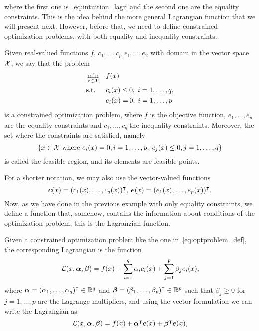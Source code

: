 where the first one is~\eqref{eq:intuition_lagr} and the second one are the equality constraints.
This is the idea behind the more general Lagrangian function that we will present next. 
However, before that, we need to define constrained optimization problems, with both equality and inequality constraints.
\begin{definition}
    Given real-valued functions $f$, $c_1, \ldots, c_p$ $e_1, \ldots, e_2$ with domain in the vector space $\mathcal{X}$,
    we say that the problem
    \begin{equation}\label{eq:optproblem_def}
        \begin{aligned}
            &\min_{x \in \vecspace} & & f(x) \\
            & \text{s.t.} & & c_i(x) \leq 0,\; i=1, \ldots, q , \\
            & & & e_i(x) = 0,\; i=1, \ldots, p              
        \end{aligned}
    \end{equation}
    is a constrained optimization problem, where $f$ is the objective function, $e_1, \ldots, e_p$ are the equality constraints and $c_1, \ldots, c_q$ the inequality constraints.
    Moreover, the set where the constraints are satisfied, namely
    \begin{equation}
        \nonumber
        \left\{x \in \mathcal{X} \text{ where } e_i(x)=0, i=1, \ldots, p; \; c_j(x)\leq 0, j=1, \ldots, q\right\}
    \end{equation}
    is called the feasible region, and its elements are feasible points.
\end{definition}
For a shorter notation, we may also use the vector-valued functions 
$$\bm{c}(x) = (c_1(x), \ldots, c_q(x))^\intercal, \; \bm{e}(x) = (e_1(x), \ldots, e_p(x))^\intercal .   $$
Now, as we have done in the previous example with only equality constraints, we define a function that, somehow, contains the information about conditions of the optimization problem, this is the Lagrangian function.
\begin{definition}[Lagrangian]
    Given a constrained optimization problem like the one in~\eqref{eq:optproblem_def}, the corresponding Lagrangian is the function 
    \begin{equation}
        \label{eq:lagr_def}
        \lagr(x, \fv{\alpha}, \fv{\beta}) = f(x) + \sum_{i=1}^q \alpha_i c_i(x) + \sum_{j=1}^p \beta_j e_i(x) ,
    \end{equation}
    where $\bm{\alpha} = (\alpha_1, \ldots, \alpha_q)^\intercal \in \mathbb{R}^q$ and $\bm{\beta} = (\beta_1, \ldots, \beta_p)^\intercal \in \mathbb{R}^p$ such that $\beta_j \geq 0$ for $j=1, \ldots, p$ are the Lagrange multipliers, and using the vector formulation we can write the Lagrangian as 
    \begin{equation}
        \label{eq:lagr_defvec}
        \lagr(x, \fv{\alpha}, \fv{\beta}) = f(x) + \fv{\alpha}^\intercal \fv{c}(x) + \fv{\beta}^\intercal \fv{e}(x) ,
    \end{equation}
\end{definition}
